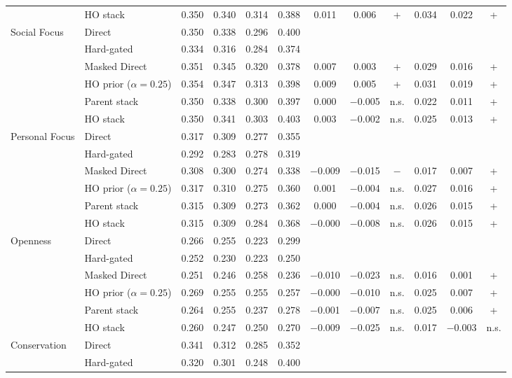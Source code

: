 {{\begin{longtable}{llcccccccccc}
 & HO stack & 0.350 & 0.340 & 0.314 & 0.388 & 0.011 & 0.006 & + & 0.034 & 0.022 & + \\
Social Focus & Direct & 0.350 & 0.338 & 0.296 & 0.400 &  &  &  &  &  &  \\
 & Hard-gated & 0.334 & 0.316 & 0.284 & 0.374 &  &  &  &  &  &  \\
 & Masked Direct & 0.351 & 0.345 & 0.320 & 0.378 & 0.007 & 0.003 & + & 0.029 & 0.016 & + \\
 & HO prior ($\alpha=0.25$) & 0.354 & 0.347 & 0.313 & 0.398 & 0.009 & 0.005 & + & 0.031 & 0.019 & + \\
 & Parent stack & 0.350 & 0.338 & 0.300 & 0.397 & 0.000 & $-$0.005 & n.s. & 0.022 & 0.011 & + \\
 & HO stack & 0.350 & 0.341 & 0.303 & 0.403 & 0.003 & $-$0.002 & n.s. & 0.025 & 0.013 & + \\
Personal Focus & Direct & 0.317 & 0.309 & 0.277 & 0.355 &  &  &  &  &  &  \\
 & Hard-gated & 0.292 & 0.283 & 0.278 & 0.319 &  &  &  &  &  &  \\
 & Masked Direct & 0.308 & 0.300 & 0.274 & 0.338 & $-$0.009 & $-$0.015 & $-$ & 0.017 & 0.007 & + \\
 & HO prior ($\alpha=0.25$) & 0.317 & 0.310 & 0.275 & 0.360 & 0.001 & $-$0.004 & n.s. & 0.027 & 0.016 & + \\
 & Parent stack & 0.315 & 0.309 & 0.273 & 0.362 & 0.000 & $-$0.004 & n.s. & 0.026 & 0.015 & + \\
 & HO stack & 0.315 & 0.309 & 0.284 & 0.368 & $-$0.000 & $-$0.008 & n.s. & 0.026 & 0.015 & + \\
Openness & Direct & 0.266 & 0.255 & 0.223 & 0.299 &  &  &  &  &  &  \\
 & Hard-gated & 0.252 & 0.230 & 0.223 & 0.250 &  &  &  &  &  &  \\
 & Masked Direct & 0.251 & 0.246 & 0.258 & 0.236 & $-$0.010 & $-$0.023 & n.s. & 0.016 & 0.001 & + \\
 & HO prior ($\alpha=0.25$) & 0.269 & 0.255 & 0.255 & 0.257 & $-$0.000 & $-$0.010 & n.s. & 0.025 & 0.007 & + \\
 & Parent stack & 0.264 & 0.255 & 0.237 & 0.278 & $-$0.001 & $-$0.007 & n.s. & 0.025 & 0.006 & + \\
 & HO stack & 0.260 & 0.247 & 0.250 & 0.270 & $-$0.009 & $-$0.025 & n.s. & 0.017 & $-$0.003 & n.s. \\
Conservation & Direct & 0.341 & 0.312 & 0.285 & 0.352 &  &  &  &  &  &  \\
 & Hard-gated & 0.320 & 0.301 & 0.248 & 0.400 &  &  &  &  &  &  \\

\end{longtable}}}
